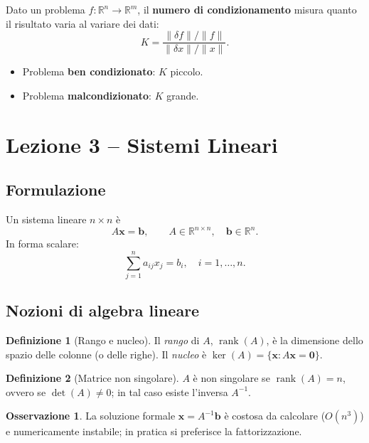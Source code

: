 \documentclass[12pt,a4paper]{article}
\theoremstyle{definition}
\newtheorem{definizione}{Definizione}[section]
\newtheorem{osservazione}{Osservazione}[section]
\begin{document}
Dato un problema $f: \mathbb{R}^n \to \mathbb{R}^m$, il \textbf{numero di condizionamento} misura quanto il risultato varia al variare dei dati:
\[
  K = \frac{\|\delta f\| / \|f\|}{\|\delta x\| / \|x\|}.
\]

\begin{itemize}
  \item Problema \textbf{ben condizionato}: $K$ piccolo.
  \item Problema \textbf{malcondizionato}: $K$ grande.
\end{itemize}

\section{Lezione 3 -- Sistemi Lineari}

\subsection{Formulazione}

Un sistema lineare $n \times n$ è
\[
  A\mathbf{x} = \mathbf{b},
  \qquad
  A \in \mathbb{R}^{n \times n},\quad
  \mathbf{b} \in \mathbb{R}^n.
\]
In forma scalare:
\[
  \sum_{j=1}^{n} a_{ij} x_j = b_i, \quad i = 1, \ldots, n.
\]

\subsection{Nozioni di algebra lineare}

\begin{definizione}[Rango e nucleo]
Il \emph{rango} di $A$, $\operatorname{rank}(A)$, è la dimensione dello spazio delle colonne (o delle righe). Il \emph{nucleo} è $\ker(A) = \{\mathbf{x}: A\mathbf{x} = \mathbf{0}\}$.
\end{definizione}

\begin{definizione}[Matrice non singolare]
$A$ è non singolare se $\operatorname{rank}(A) = n$, ovvero se $\det(A) \neq 0$; in tal caso esiste l'inversa $A^{-1}$.
\end{definizione}

\begin{osservazione}
La soluzione formale $\mathbf{x} = A^{-1}\mathbf{b}$ è costosa da calcolare ($O(n^3)$) e numericamente instabile; in pratica si preferisce la fattorizzazione.
\end{osservazione}
\end{document}
